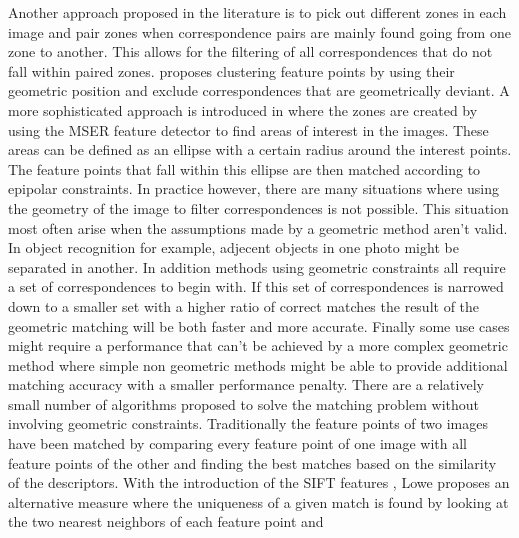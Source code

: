 \documentclass[12pt,journal,compsoc]{IEEEtran}
\begin{document}
%
Another approach proposed in the literature is to pick out different 
zones in each image and pair zones when correspondence pairs are mainly 
found going from one zone to another. This allows for the filtering of 
all correspondences that do not fall within paired zones.  
\cite{das2008event} proposes clustering feature points by using their 
geometric position and exclude correspondences that are geometrically 
deviant. A more sophisticated approach is introduced in 
\cite{wu2011robust} where the zones are created by using the MSER 
feature detector to find areas of interest in the images. These areas 
can be defined as an ellipse with a certain radius around the interest 
points. The feature points that fall within this ellipse are then 
matched according to epipolar constraints.  
%
In practice however, there are many situations where using the geometry 
of the image to filter correspondences is not possible. This situation 
most often arise when the assumptions made by a geometric method aren't 
valid. In object recognition for example, adjecent objects in one photo 
might be separated in another. In addition methods using geometric 
constraints all require a set of correspondences to begin with. If this 
set of correspondences is narrowed down to a smaller set with a higher 
ratio of correct matches the result of the geometric matching will be 
both faster and more accurate.  Finally some use cases might require a 
performance that can't be achieved by a more complex geometric method 
where simple non geometric methods might be able to provide additional 
matching accuracy with a smaller performance penalty.
%
There are a relatively small number of algorithms proposed to solve the 
matching problem without involving geometric constraints. Traditionally 
the feature points of two images have been matched by comparing every 
feature point of one image with all feature points of the other and 
finding the best matches based on the similarity of the descriptors.  
With the introduction of the SIFT features \cite{lowe2004sift}, Lowe 
proposes an alternative measure where the uniqueness of a given match is 
found by looking at the two nearest neighbors of each feature point and 
\end{document}
